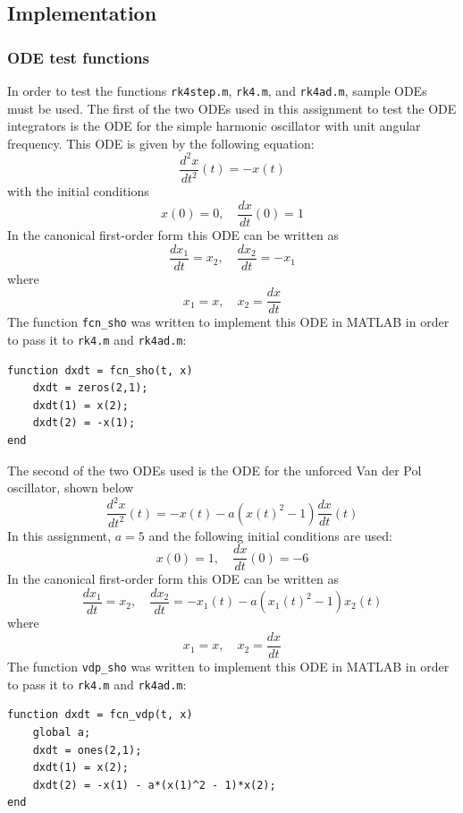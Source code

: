 \documentclass[10pt]{article}
\def\code#1{\texttt{#1}} %
\begin{document}
\subsection*{Implementation}

\subsubsection*{ODE test functions} %

In order to test the functions \code{rk4step.m}, \code{rk4.m}, and \code{rk4ad.m}, sample ODEs must be
used. The first of the two ODEs used in this assignment to test the ODE integrators is the ODE for the
simple harmonic oscillator with unit angular frequency. This ODE is given by the following equation:
\begin{equation}\label{sho_ode}
\frac{d^2x}{dt^2}(t) = -x(t)
\end{equation}
with the initial conditions 
$$x(0) = 0, \quad \frac{dx}{dt}(0) = 1$$
In the canonical first-order form this ODE can be written as 
$$\frac{dx_1}{dt} = x_2, \quad \frac{dx_2}{dt} = -x_1$$
where 
$$x_1 = x, \quad x_2 = \frac{dx}{dt}$$
The function \code{fcn\_sho} was written to implement this ODE in MATLAB in order to pass it to 
\code{rk4.m} and \code{rk4ad.m}:
\begin{verbatim}
function dxdt = fcn_sho(t, x)
    dxdt = zeros(2,1);
    dxdt(1) = x(2);
    dxdt(2) = -x(1); 
end
\end{verbatim}

The second of the two ODEs used is the ODE for the unforced Van der Pol oscillator, shown below
\begin{equation}\label{vdp_ode}
\frac{d^2x}{dt^2}(t) = -x(t) - a(x(t)^2 - 1)\frac{dx}{dt}(t)
\end{equation}
In this assignment, $a = 5$ and the following initial conditions are used: 
$$x(0) = 1, \quad \frac{dx}{dt}(0) = -6$$
In the canonical first-order form this ODE can be written as 
$$\frac{dx_1}{dt} = x_2, \quad \frac{dx_2}{dt} = -x_1(t) - a(x_1(t)^2 - 1)x_2(t)$$
where 
$$x_1 = x, \quad x_2 = \frac{dx}{dt}$$
The function \code{vdp\_sho} was written to implement this ODE in MATLAB in order to pass it to 
\code{rk4.m} and \code{rk4ad.m}:
\begin{verbatim}
function dxdt = fcn_vdp(t, x)
    global a;
    dxdt = ones(2,1);
    dxdt(1) = x(2);
    dxdt(2) = -x(1) - a*(x(1)^2 - 1)*x(2);
end
\end{verbatim}
\end{document}
